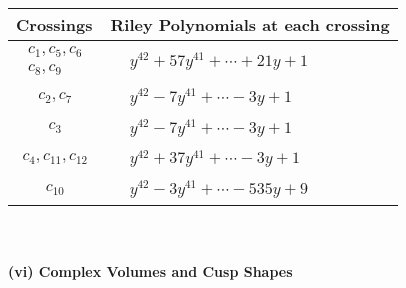 \documentclass[1p]{elsarticle_modified}
\theoremstyle{definition}
\begin{document}
\begin{tabular}{m{50pt}|m{274pt}}
Crossings & \hspace{64pt}Riley Polynomials at each crossing \\
\hline $$\begin{aligned}c_{1},c_{5},c_{6}\\c_{8},c_{9}\end{aligned}$$&$\begin{aligned}
&y^{42}+57 y^{41}+\cdots+21 y+1
\end{aligned}$\\
\hline $$\begin{aligned}c_{2},c_{7}\end{aligned}$$&$\begin{aligned}
&y^{42}-7 y^{41}+\cdots-3 y+1
\end{aligned}$\\
\hline $$\begin{aligned}c_{3}\end{aligned}$$&$\begin{aligned}
&y^{42}-7 y^{41}+\cdots-3 y+1
\end{aligned}$\\
\hline $$\begin{aligned}c_{4},c_{11},c_{12}\end{aligned}$$&$\begin{aligned}
&y^{42}+37 y^{41}+\cdots-3 y+1
\end{aligned}$\\
\hline $$\begin{aligned}c_{10}\end{aligned}$$&$\begin{aligned}
&y^{42}-3 y^{41}+\cdots-535 y+9
\end{aligned}$\\
\hline
\end{tabular}\\~\\
\newpage\flushleft \textbf{(vi) Complex Volumes and Cusp Shapes}
\end{document}
